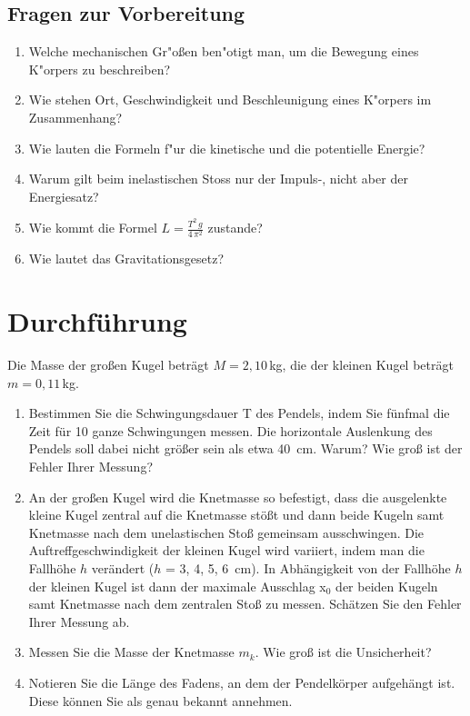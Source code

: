 \begin{tutorhint}
\section{Fragen zur Vorbereitung}

\begin{enumerate} 
 \item Welche mechanischen Gr"o{\ss}en ben"otigt man, um die Bewegung eines K"orpers zu beschreiben?
 \item Wie stehen Ort, Geschwindigkeit und Beschleunigung eines K"orpers im Zusammenhang?
 \item Wie lauten die Formeln f"ur die kinetische und die potentielle Energie?
 \item Warum gilt beim inelastischen Stoss nur der Impuls-, nicht aber der Energiesatz?
 \item Wie kommt die Formel $L=\frac{T^2\,g}{4\,\pi^2}$ zustande?
 \item Wie lautet das Gravitationsgesetz?
\end{enumerate} 

\end{tutorhint}
\section{Durchführung} 

Die Masse der großen Kugel beträgt $M = 2,10$\,kg, die der kleinen Kugel beträgt $m=0,11$\,kg.

\begin{enumerate}
%
\item Bestimmen Sie die Schwingungsdauer T des Pendels, indem Sie fünfmal die Zeit für 10 ganze Schwingungen messen. Die horizontale Auslenkung des Pendels soll dabei nicht größer sein als etwa 40~cm. Warum? Wie groß ist der Fehler Ihrer Messung? \label{Mess:Schwingungsdauer}
%
\item An der großen Kugel wird die Knetmasse so befestigt, dass die ausgelenkte kleine Kugel zentral auf die Knetmasse stößt und dann beide Kugeln samt Knetmasse nach dem unelastischen Stoß gemeinsam ausschwingen. Die Auftreffgeschwindigkeit der kleinen Kugel wird variiert, indem man die Fallhöhe $h$ verändert ($h$ = 3, 4, 5, 6~cm). In Abhängigkeit von der Fallhöhe $h$ der kleinen Kugel ist dann der maximale Ausschlag x$_0$ der beiden Kugeln samt Knetmasse nach dem zentralen Stoß zu messen. Schätzen Sie den Fehler Ihrer Messung ab.
\label{Mess:inelast_Stoss}
%
\item Messen Sie die Masse der Knetmasse $m_k$. Wie groß ist die Unsicherheit?
%
\item Notieren Sie die Länge des Fadens, an dem der Pendelkörper aufgehängt ist. Diese können Sie als genau bekannt annehmen.
%
\end{enumerate}

